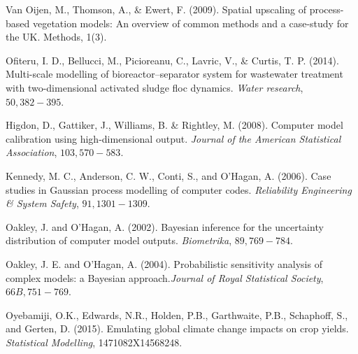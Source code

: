 \begin{thebibliography}{94}
  Van Oijen, M., Thomson, A., \& Ewert, F. (2009). Spatial upscaling of process-based vegetation models: An overview of common methods and a case-study for the UK. Methods, 1(3).
 
 Ofiteru, I. D., Bellucci, M., Picioreanu, C., Lavric, V., \& Curtis, T. P. (2014). Multi-scale modelling of bioreactor–separator system for wastewater treatment with two-dimensional activated sludge floc dynamics. {\it Water research}, $50, 382-395$.






 Higdon, D., Gattiker, J., Williams, B. \& Rightley, M. (2008). Computer model calibration using high-dimensional output. {\it Journal of the American Statistical Association}, $103, 570-583$.


 Kennedy, M. C., Anderson, C. W., Conti, S., and O'Hagan, A. (2006). Case studies in Gaussian process modelling of computer codes. {\it Reliability Engineering \& System Safety}, $91, 1301-1309$.



 Oakley, J. and O'Hagan, A. (2002). Bayesian inference for the uncertainty distribution of computer model outputs. {\it Biometrika}, $89, 769-784$.

 Oakley, J. E. and O'Hagan, A. (2004). Probabilistic sensitivity analysis of complex models: a Bayesian approach.{\it Journal of Royal Statistical Society}, $66B, 751-769$.


 Oyebamiji, O.K., Edwards, N.R., Holden, P.B., Garthwaite, P.B., Schaphoff, S., and Gerten, D. (2015). Emulating global climate change impacts on crop yields. {\it Statistical Modelling}, 1471082X14568248.


\end{thebibliography}
